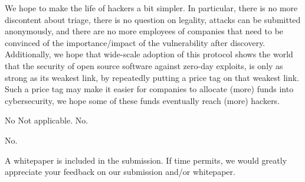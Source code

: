 \documentclass{article}
\begin{document}
%
%
%
%
We hope to make the life of hackers a bit simpler. In particular, there is no more discontent about triage, there is no question on legality, attacks can be submitted anonymously, and there are no more employees of companies that need to be convinced of the importance/impact of the vulnerability after discovery.
Additionally, we hope that wide-scale adoption of this protocol shows the world that the security of open source software against zero-day exploits, is only as strong as its weakest link, by repeatedly putting a price tag on that weakest link. Such a price tag may make it easier for companies to allocate (more) funds into cybersecurity, we hope some of these funds eventually reach (more) hackers.

No
Not applicable.
No.

No.

A whitepaper is included in the submission. If time permits, we would greatly appreciate your feedback on our submission and/or whitepaper.
\end{document}
